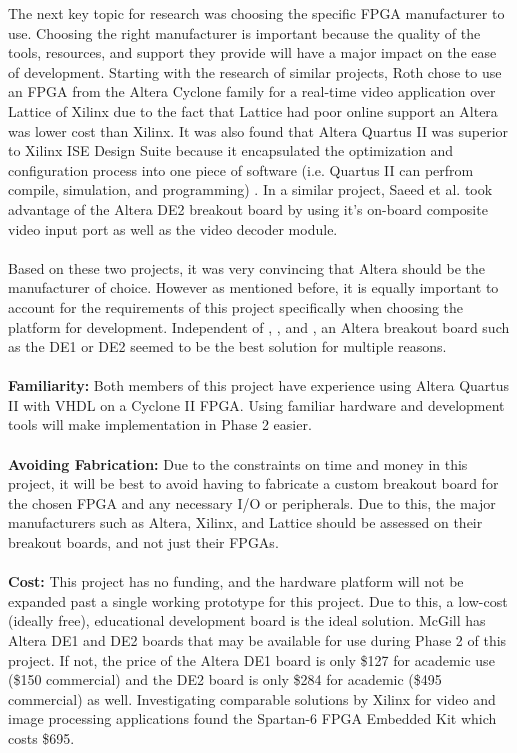 \documentclass[12pt]{article} %
\begin{document}
The next key topic for research was choosing the specific FPGA manufacturer to use. Choosing the right manufacturer is important because the quality of the tools, resources, and support they provide will have a major impact on the ease of development. Starting with the research of similar projects, Roth \cite{1} chose to use an FPGA from the Altera Cyclone family for a real-time video application over Lattice of Xilinx due to the fact that Lattice had poor online support an Altera was lower cost than Xilinx. It was also found that Altera Quartus II was superior to Xilinx ISE Design Suite because it encapsulated the optimization and configuration process into one piece of software (i.e. Quartus II can perfrom compile, simulation, and programming) \cite{1}. In a similar project, Saeed et al. \cite{2} took advantage of the Altera DE2 breakout board by using it's on-board composite video input port as well as the video decoder module. \\\\
Based on these two projects, it was very convincing that Altera should be the manufacturer of choice. However as mentioned before, it is equally important to account for the requirements of this project specifically when choosing the platform for development. Independent of \cite{1}, \cite{2}, and \cite{3}, an Altera breakout board such as the DE1 or DE2 seemed to be the best solution for multiple reasons. \\\\
\textbf{Familiarity:} Both members of this project have experience using Altera Quartus II with VHDL on a Cyclone II FPGA. Using familiar hardware and development tools will make implementation in Phase 2 easier. \\\\
\textbf{Avoiding Fabrication:} Due to the constraints on time and money in this project, it will be best to avoid having to fabricate a custom breakout board for the chosen FPGA and any necessary I/O or peripherals. Due to this, the major manufacturers such as Altera, Xilinx, and Lattice should be assessed on their breakout boards, and not just their FPGAs.\\\\
\textbf{Cost:} This project has no funding, and the hardware platform will not be expanded past a single working prototype for this project. Due to this, a low-cost (ideally free), educational development board is the ideal solution. McGill has Altera DE1 and DE2 boards that may be available for use during Phase 2 of this project. If not, the price of the Altera DE1 board is only \$127 for academic use (\$150 commercial) and the DE2 board is only \$284 for academic (\$495 commercial) as well. Investigating comparable solutions by Xilinx for video and image processing applications found the Spartan-6 FPGA Embedded Kit which costs \$695.
\end{document}
